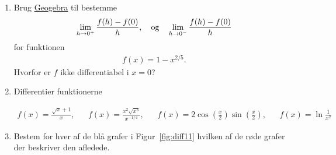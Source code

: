 \begin{enumerate}
	\item Brug \href{https://www.geogebra.org/m/eTmzBFEq}{Geogebra} til bestemme 
	\begin{align*}
	\lim_{h\to 0^+} \frac{f(h)-f(0)}{h},\quad \textup{og}\quad \lim_{h\to 0^-} \frac{f(h)-f(0)}{h}
	\end{align*}
	 for funktionen
	\begin{align*}
	f(x)=1-x^{2/5}.
	\end{align*}
	Hvorfor er $f$ ikke differentiabel i $x=0$?
	
	\item Differentier funktionerne
	
	\begin{align*}
		f(x)=\frac{\sqrt{x}+1}{x},&& f(x)=\frac{x^2\sqrt{x^3}}{x^{-1/4}},&& f(x)=2\cos(\frac{x}{2})\sin(\frac{x}{2}),&&f(x)=\ln\frac{1}{x^2}
	\end{align*}
	
	

	
	\item \label{it:diff11} Bestem for hver af de blå grafer i Figur~\ref{fig:diff11} hvilken af de røde grafer der beskriver den afledede.
		\begin{figure}
		\centering
		

\end{figure}
\end{enumerate}
